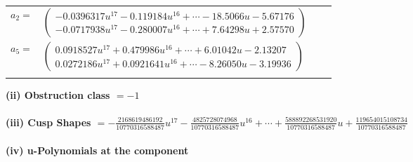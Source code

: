 \documentclass[1p]{elsarticle_modified}
\theoremstyle{definition}
\begin{document}
\begin{tabular}{m{7pt} m{180pt} m{7pt} m{180pt} }
\flushright $a_{2}=$&$\begin{pmatrix}-0.0396317 u^{17}-0.119184 u^{16}+\cdots-18.5066 u-5.67176\\-0.0717938 u^{17}-0.280007 u^{16}+\cdots+7.64298 u+2.57570\end{pmatrix}$ \\
\flushright $a_{5}=$&$\begin{pmatrix}0.0918527 u^{17}+0.479986 u^{16}+\cdots+6.01042 u-2.13207\\0.0272186 u^{17}+0.0921641 u^{16}+\cdots-8.26050 u-3.19936\end{pmatrix}$\\&\end{tabular}
\flushleft \textbf{(ii) Obstruction class $= -1$}\\~\\
\flushleft \textbf{(iii) Cusp Shapes $= -\frac{2168619486192}{10770316588487} u^{17}-\frac{4825728074968}{10770316588487} u^{16}+\cdots+\frac{588892268531920}{10770316588487} u+\frac{119654015108734}{10770316588487}$}\\~\\
\newpage\renewcommand{\arraystretch}{1}
\flushleft \textbf{(iv) u-Polynomials at the component}\newline \\
\end{document}

